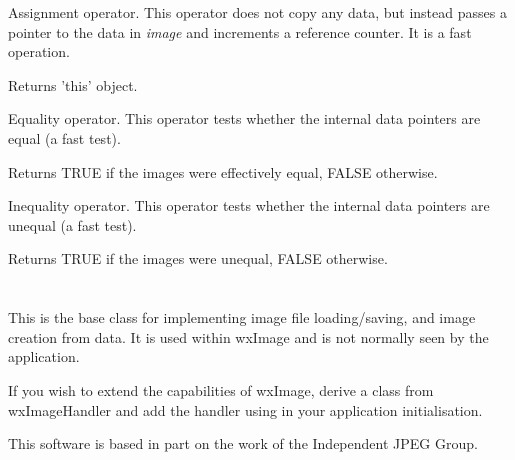 Assignment operator. This operator does not copy any data, but instead
passes a pointer to the data in {\it image} and increments a reference
counter. It is a fast operation.




Returns 'this' object.



Equality operator. This operator tests whether the internal data pointers are
equal (a fast test).




Returns TRUE if the images were effectively equal, FALSE otherwise.



Inequality operator. This operator tests whether the internal data pointers are
unequal (a fast test).




Returns TRUE if the images were unequal, FALSE otherwise.

\section{}\label{wximagehandler}

This is the base class for implementing image file loading/saving, and image creation from data.
It is used within wxImage and is not normally seen by the application.

If you wish to extend the capabilities of wxImage, derive a class from wxImageHandler
and add the handler using  in your
application initialisation.


This software is based in part on the work of the Independent JPEG Group.

